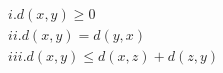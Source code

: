 \documentclass[preview]{standalone}
\begin{document}
\begin{align*}
& i.  d(x,y) \geq 0 \\& ii.  d(x,y)=d(y,x) \\& iii.  d(x,y) \leq d(x,z) + d(z,y) \\&
\end{align*}
\end{document}

